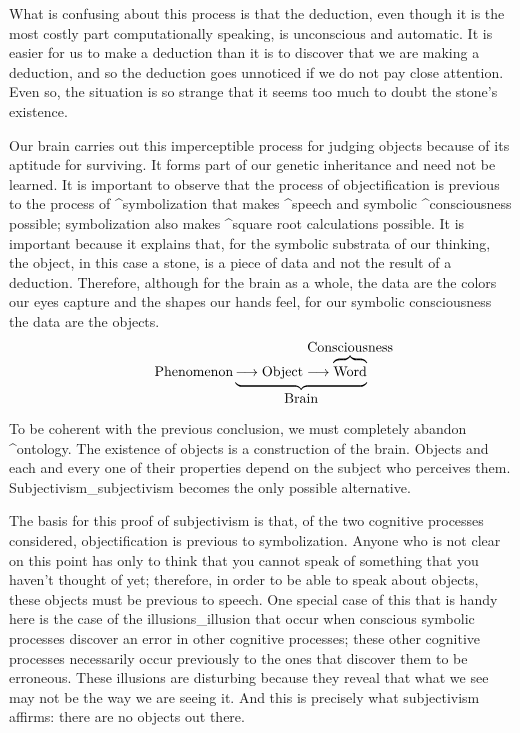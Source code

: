 What is confusing about this process is that the deduction, even though
it is the most costly part computationally speaking, is unconscious and
automatic. It is easier for us to make a deduction than it is to
discover that we are making a deduction, and so the deduction goes
unnoticed if we do not pay close attention. Even so, the situation is so
strange that it seems too much to doubt the stone's existence.

Our brain carries out this imperceptible process for judging objects
because of its aptitude for surviving. It forms part of our genetic
inheritance and need not be learned. It is important to observe that the
process of objectification is previous to the process of
^{symbolization} that makes ^{speech} and symbolic ^{consciousness}
possible; symbolization also makes ^{square root} calculations possible.
It is important because it explains that, for the symbolic substrata of
our thinking, the object, in this case a stone, is a piece of data and
not the result of a deduction. Therefore, although for the brain as a
whole, the data are the colors our eyes capture and the shapes our hands
feel, for our symbolic consciousness the data are the objects.
$$\hbox{Phenomenon} \underbrace{\longrightarrow \hbox{Object}
 \longrightarrow
 \overbrace{\hbox{\strut Word}}^{\hbox to 0pt{\hss
  Consciousness\hss}}}_{\hbox{Brain}}$$

To be coherent with the previous conclusion, we must completely abandon
^{ontology}. The existence of objects is a construction of the brain.
Objects and each and every one of their properties depend on the subject
who perceives them. Subjectivism_{subjectivism} becomes the only
possible alternative.

The basis for this proof of subjectivism is that, of the two cognitive
processes considered, objectification is previous to symbolization.
Anyone who is not clear on this point has only to think that you cannot
speak of something that you haven't thought of yet; therefore, in order
to be able to speak about objects, these objects must be previous to
speech. One special case of this that is handy here is the case of the
illusions_{illusion} that occur when conscious symbolic processes
discover an error in other cognitive processes; these other cognitive
processes necessarily occur previously to the ones that discover them to
be erroneous. These illusions are disturbing because they reveal that
what we see may not be the way we are seeing it. And this is precisely
what subjectivism affirms: there are no objects out there.

